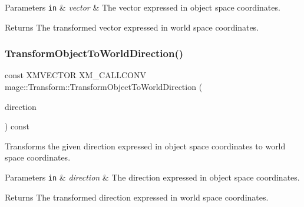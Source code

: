 \begin{DoxyParams}[1]{Parameters}
\mbox{\tt in}  & {\em vector} & The vector expressed in object space coordinates. \\
\hline
\end{DoxyParams}
\begin{DoxyReturn}{Returns}
The transformed vector expressed in world space coordinates. 
\end{DoxyReturn}
\mbox{\label{classmage_1_1_transform_ae2bd913d2092e4f41cf65072b49df4d7}} 
\subsubsection{\texorpdfstring{Transform\+Object\+To\+World\+Direction()}{TransformObjectToWorldDirection()}}
{\footnotesize\ttfamily const X\+M\+V\+E\+C\+T\+OR X\+M\+\_\+\+C\+A\+L\+L\+C\+O\+NV mage\+::\+Transform\+::\+Transform\+Object\+To\+World\+Direction (\begin{DoxyParamCaption}\item[{F\+X\+M\+V\+E\+C\+T\+OR}]{direction }\end{DoxyParamCaption}) const\hspace{0.3cm}{\ttfamily [noexcept]}}

Transforms the given direction expressed in object space coordinates to world space coordinates.


\begin{DoxyParams}[1]{Parameters}
\mbox{\tt in}  & {\em direction} & The direction expressed in object space coordinates. \\
\hline
\end{DoxyParams}
\begin{DoxyReturn}{Returns}
The transformed direction expressed in world space coordinates. 
\end{DoxyReturn}
\mbox{\label{classmage_1_1_transform_ae6a1911525810251aeb563b296f354d6}} 

